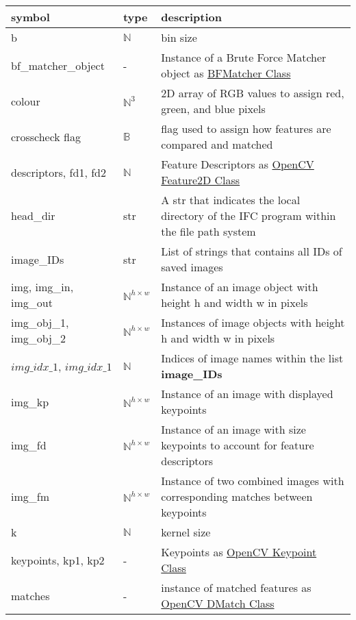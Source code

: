 \documentclass[12pt, titlepage]{article}
\begin{document}
\renewcommand{\arraystretch}{1.2}
\noindent 
\begin{longtable*}{|l l p{12cm}|} 
  \toprule
\textbf{symbol} & \textbf{type} & \textbf{description}\\
\midrule 
b & $\mathbb{N}$ & bin size\\
bf\_matcher\_object & - & Instance of a Brute Force Matcher object as \href{https://docs.opencv.org/3.4/d3/da1/classcv_1_1BFMatcher.html}{BFMatcher Class}\\
colour & $\mathbb{N}^{3}$ & 2D array of RGB values to assign red, green, and blue pixels\\
crosscheck flag & $\mathbb{B}$ & flag used to assign how features are compared and matched\\
descriptors, fd1, fd2 & $\mathbb{N}$ &	Feature Descriptors as \href{https://docs.opencv.org/4.x/d0/d13/classcv_1_1Feature2D.html}{OpenCV Feature2D Class}\\
head\_dir	& str	& A str that indicates the local directory of the IFC program within the file path system\\
image\_IDs & str & List of strings that contains all IDs of saved images\\
img, img\_in, img\_out & $\mathbb{N}^{h \times w}$& Instance of an image object with height h and width w in pixels\\
img\_obj\_1, img\_obj\_2 & $\mathbb{N}^{h \times w}$& Instances of image objects with height h and width w in pixels\\
$img\_idx\_1$, $img\_idx\_1$ & $\mathbb{N}$ & Indices of image names within the list \textbf{image\_IDs}\\
img\_kp	& $\mathbb{N}^{h \times w}$	& Instance of an image with displayed keypoints\\
img\_fd	& $\mathbb{N}^{h \times w}$	& Instance of an image with size keypoints to account for feature descriptors\\
img\_fm	& $\mathbb{N}^{h \times w}$ & Instance of two combined images with corresponding matches between keypoints\\
k & $\mathbb{N}$ & kernel size \\
keypoints, kp1, kp2 & - & Keypoints as \href{https://docs.opencv.org/3.4/d2/d29/classcv_1_1KeyPoint.html}{OpenCV Keypoint Class}\\
matches & - & instance of matched features as \href{https://docs.opencv.org/3.4/d4/de0/classcv_1_1DMatch.html}{OpenCV DMatch Class} \\

\end{longtable*}
\end{document}
